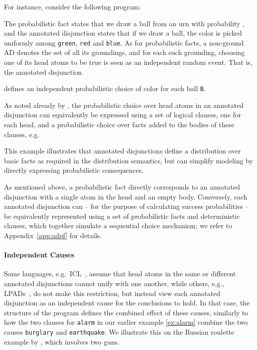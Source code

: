 \documentclass[a4paper]{article}
\begin{document}
For instance, consider the following program:

The probabilistic fact states that we draw a ball from an urn with
probability , and the annotated disjunction states that if we
draw a ball, the color is picked uniformly among \verb|green|,
\verb|red| and \verb|blue|. As for probabilistic facts,
a non-ground AD denotes the set of all its groundings, and for each
such grounding, choosing one of its head atoms to be true is seen as
an independent random event. That is, the annotated disjunction

defines an independent probabilistic choice of color for each ball
\verb|B|. 

As noted already by \citet{Vennekens04}, the probabilistic choice over
head atoms in an annotated disjunction can equivalently be expressed
using a set of logical clauses, one for each head, and a probabilistic
choice over facts added to the bodies of these clauses, e.g.

This example illustrates that annotated disjunctions define  a distribution  
over basic facts as required in the 
distribution semantics, but can simplify modeling by directly expressing
probabilistic consequences. 

As mentioned above, a probabilistic fact directly corresponds to an
annotated disjunction with a single atom in the head and an empty
body. Conversely, each annotated disjunction can -- for the purpose of
calculating success probabilities -- be equivalently
represented using a set of probabilistic facts and deterministic
clauses, which together simulate a sequential choice mechanism; we
refer to Appendix~\ref{app:adpf} for details. 



\paragraph{Independent Causes}\label{sec:noisy-or-in-lp} 
Some languages, e.g.~ICL~\citep{Poole08}, assume that head atoms in
the  same or different annotated disjunctions cannot unify with one
another, while others, e.g., LPADs~\citep{Vennekens04}, do not make
this restriction, but instead view each annotated disjunction as an 
independent cause for the conclusions to hold. In that case, the
structure of the program defines the combined effect of these causes,
similarly to how the two clauses for \verb|alarm| in our earlier
example \eqref{ex:alarm} combine the two causes \verb|burglary| and \verb|earthquake|.  
We illustrate this on the Russian roulette example by \cite{vennekens:tplp09},
which involves two guns.
\end{document}

